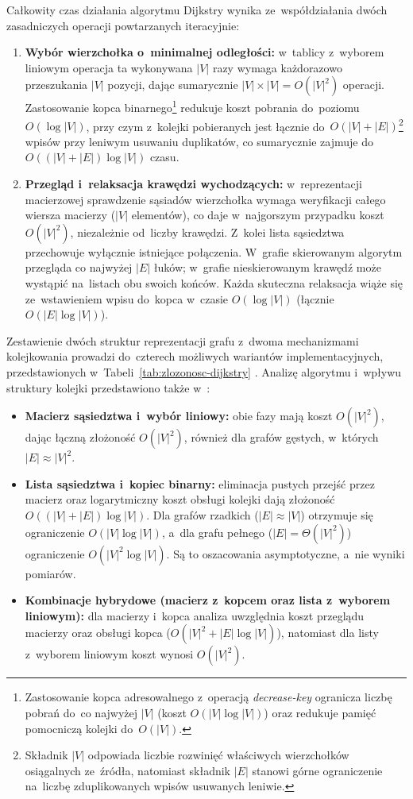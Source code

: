 \documentclass[11pt,a4paper,oneside]{report}
\begin{document}
Całkowity czas działania algorytmu Dijkstry wynika ze~współdziałania dwóch zasadniczych operacji powtarzanych iteracyjnie:
\begin{enumerate}
  \item \textbf{Wybór wierzchołka o~minimalnej odległości:} w~tablicy z~wyborem liniowym operacja ta wykonywana $|V|$ razy wymaga każdorazowo przeszukania $|V|$ pozycji, dając sumarycznie $|V| \times |V| = O(|V|^2)$ operacji. Zastosowanie kopca binarnego\footnote{Zastosowanie kopca adresowalnego z~operacją \textit{decrease-key} ogranicza liczbę pobrań do~co najwyżej $|V|$ (koszt $O(|V|\log |V|)$) oraz redukuje pamięć pomocniczą kolejki do~$O(|V|)$.} redukuje koszt pobrania do~poziomu $O(\log |V|)$, przy czym z~kolejki pobieranych jest łącznie do~$O(|V| + |E|)$\footnote{Składnik $|V|$ odpowiada liczbie rozwinięć właściwych wierzchołków osiągalnych ze~źródła, natomiast składnik $|E|$ stanowi górne ograniczenie na~liczbę zduplikowanych wpisów usuwanych leniwie.} wpisów przy leniwym usuwaniu duplikatów, co sumarycznie zajmuje do~$O((|V| + |E|)\log |V|)$ czasu.
  \item \textbf{Przegląd i~relaksacja krawędzi wychodzących:} w~reprezentacji macierzowej sprawdzenie sąsiadów wierzchołka wymaga weryfikacji całego wiersza macierzy ($|V|$ elementów), co daje w~najgorszym przypadku koszt $O(|V|^2)$, niezależnie od~liczby krawędzi. Z~kolei lista sąsiedztwa przechowuje wyłącznie istniejące połączenia. W~grafie skierowanym algorytm przegląda co najwyżej $|E|$ łuków; w~grafie nieskierowanym krawędź może wystąpić na~listach obu swoich końców. Każda skuteczna relaksacja wiąże się ze~wstawieniem wpisu do~kopca w~czasie $O(\log |V|)$ (łącznie $O(|E|\log |V|)$).
\end{enumerate}

Zestawienie dwóch struktur reprezentacji grafu z~dwoma mechanizmami kolejkowania prowadzi do~czterech możliwych wariantów implementacyjnych, przedstawionych w~Tabeli~\ref{tab:zlozonosc-dijkstry} \cite{geeksforgeeks-2025-dijkstracomplexity}. Analizę algorytmu i~wpływu struktury kolejki przedstawiono także w~\cite{sedgewick-nd-shortestpaths}:
\begin{itemize}
  \item \textbf{Macierz sąsiedztwa i~wybór liniowy:} obie fazy mają koszt $O(|V|^2)$, dając łączną złożoność $O(|V|^2)$, również dla grafów gęstych, w~których $|E| \approx |V|^2$.
  \item \textbf{Lista sąsiedztwa i~kopiec binarny:} eliminacja pustych przejść przez macierz oraz logarytmiczny koszt obsługi kolejki dają złożoność $O((|V|+|E|)\log |V|)$. Dla grafów rzadkich ($|E| \approx |V|$) otrzymuje się ograniczenie $O(|V|\log |V|)$, a~dla grafu pełnego ($|E| = \Theta(|V|^2)$) ograniczenie $O(|V|^2\log |V|)$. Są to oszacowania asymptotyczne, a~nie wyniki pomiarów.
  \item \textbf{Kombinacje hybrydowe (macierz z~kopcem oraz lista z~wyborem liniowym):} dla macierzy i~kopca analiza uwzględnia koszt przeglądu macierzy oraz obsługi kopca ($O(|V|^2 + |E|\log |V|)$), natomiast dla listy z~wyborem liniowym koszt wynosi $O(|V|^2)$.
\end{itemize}
\end{document}
